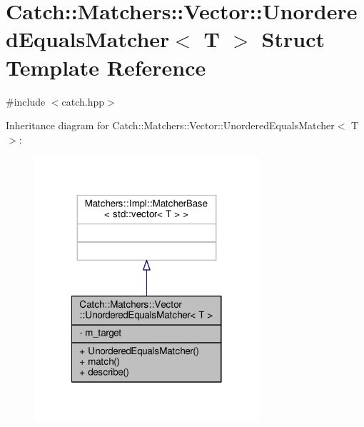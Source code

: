 \hypertarget{struct_catch_1_1_matchers_1_1_vector_1_1_unordered_equals_matcher}{\section{Catch\-:\-:Matchers\-:\-:Vector\-:\-:Unordered\-Equals\-Matcher$<$ T $>$ Struct Template Reference}
\label{struct_catch_1_1_matchers_1_1_vector_1_1_unordered_equals_matcher}
}


{\ttfamily \#include $<$catch.\-hpp$>$}



Inheritance diagram for Catch\-:\-:Matchers\-:\-:Vector\-:\-:Unordered\-Equals\-Matcher$<$ T $>$\-:
\nopagebreak
\begin{figure}[H]
\begin{center}
\leavevmode
\includegraphics[width=236pt]{struct_catch_1_1_matchers_1_1_vector_1_1_unordered_equals_matcher__inherit__graph}
\end{center}
\end{figure}


